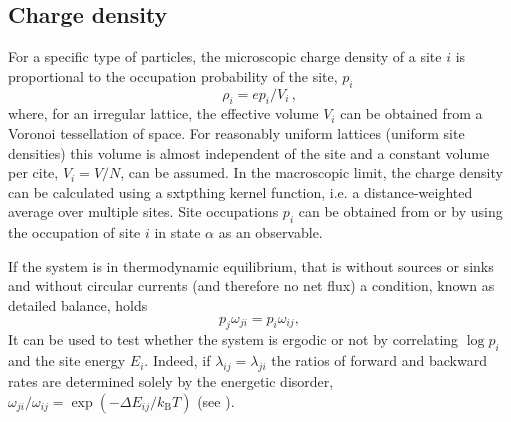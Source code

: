 \subsection{Charge density}
\label{sec:occupation}

For a specific type of particles, the microscopic charge density of a site $i$ 
is proportional to the occupation probability of the site, $p_i$
\begin{equation}
 \rho_i = e p_i / V_i\, ,
\end{equation}
where,  for an irregular lattice, the effective volume $V_i$ can be obtained 
from a Voronoi tessellation of space. For reasonably uniform lattices (uniform 
site densities) this volume is almost independent of the site and a constant 
volume per cite, $V_i = V/N$, can be assumed.  In the macroscopic limit, the 
charge density can be calculated using a sxtpthing kernel function, i.e. a 
distance-weighted average over multiple sites. Site occupations $p_i$ can be 
obtained from  or   by using the occupation of site $i$ 
in state $\alpha$ as an observable.

If the system is in thermodynamic equilibrium, that is without sources or sinks 
and without circular currents (and therefore no net flux) a condition, known as 
detailed balance, holds
%
\begin{equation}
\label{equ:detailed_balance}
  p_j \omega_{ji} = p_i \omega_{ij},
\end{equation}
%
It can be used to test whether the system is ergodic or not by correlating $\log 
p_i$ and the site energy $E_i$. Indeed, if $\lambda_{ij} = \lambda_{ji}$ the 
ratios of forward and backward rates are determined solely by the energetic 
disorder, $\omega_{ji} / \omega_{ij} = \exp(-\Delta E_{ij} / k_\text{B} T)$ (see 
).

